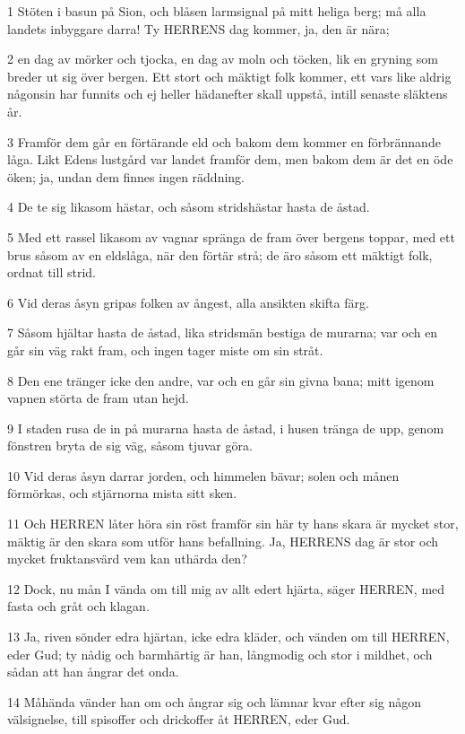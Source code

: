 \par 1 Stöten i basun på Sion, och blåsen larmsignal på mitt heliga berg; må alla landets inbyggare darra! Ty HERRENS dag kommer, ja, den är nära;
\par 2 en dag av mörker och tjocka, en dag av moln och töcken, lik en gryning som breder ut sig över bergen. Ett stort och mäktigt folk kommer, ett vars like aldrig någonsin har funnits och ej heller hädanefter skall uppstå, intill senaste släktens år.
\par 3 Framför dem går en förtärande eld och bakom dem kommer en förbrännande låga. Likt Edens lustgård var landet framför dem, men bakom dem är det en öde öken; ja, undan dem finnes ingen räddning.
\par 4 De te sig likasom hästar, och såsom stridshästar hasta de åstad.
\par 5 Med ett rassel likasom av vagnar spränga de fram över bergens toppar, med ett brus såsom av en eldslåga, när den förtär strå; de äro såsom ett mäktigt folk, ordnat till strid.
\par 6 Vid deras åsyn gripas folken av ångest, alla ansikten skifta färg.
\par 7 Såsom hjältar hasta de åstad, lika stridsmän bestiga de murarna; var och en går sin väg rakt fram, och ingen tager miste om sin stråt.
\par 8 Den ene tränger icke den andre, var och en går sin givna bana; mitt igenom vapnen störta de fram utan hejd.
\par 9 I staden rusa de in på murarna hasta de åstad, i husen tränga de upp, genom fönstren bryta de sig väg, såsom tjuvar göra.
\par 10 Vid deras åsyn darrar jorden, och himmelen bävar; solen och månen förmörkas, och stjärnorna mista sitt sken.
\par 11 Och HERREN låter höra sin röst framför sin här ty hans skara är mycket stor, mäktig är den skara som utför hans befallning. Ja, HERRENS dag är stor och mycket fruktansvärd vem kan uthärda den?
\par 12 Dock, nu mån I vända om till mig av allt edert hjärta, säger HERREN, med fasta och gråt och klagan.
\par 13 Ja, riven sönder edra hjärtan, icke edra kläder, och vänden om till HERREN, eder Gud; ty nådig och barmhärtig är han, långmodig och stor i mildhet, och sådan att han ångrar det onda.
\par 14 Måhända vänder han om och ångrar sig och lämnar kvar efter sig någon välsignelse, till spisoffer och drickoffer åt HERREN, eder Gud.
